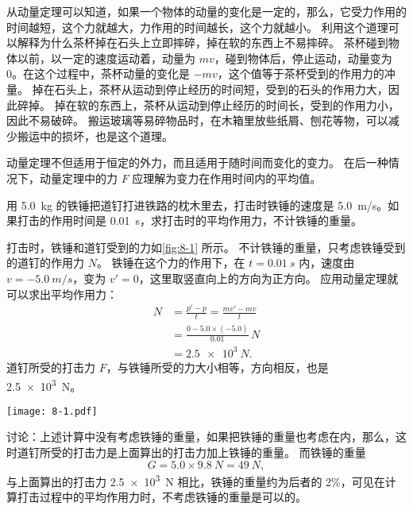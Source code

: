 从动量定理可以知道，如果一个物体的动量的变化是一定的，那么，它受力作用的时间越短，这个力就越大，力作用的时间越长，这个力就越小。
利用这个道理可以解释为什么茶杯掉在石头上立即摔碎，掉在软的东西上不易摔碎。
茶杯碰到物体以前，以一定的速度运动着，动量为 $mv$，碰到物体后，停止运动，动量变为 0。在这个过程中，茶杯动量的变化是 $-mv$，这个值等于茶杯受到的作用力的冲量。
掉在石头上，茶杯从运动到停止经历的时间短，受到的石头的作用力大，因此碎掉。
掉在软的东西上，茶杯从运动到停止经历的时间长，受到的作用力小，因此不易破碎。
搬运玻璃等易碎物品时，在木箱里放些纸屑、刨花等物，可以减少搬运中的损坏，也是这个道理。

动量定理不但适用于恒定的外力，而且适用于随时间而变化的变力。
在后一种情况下，动量定理中的力 $F$ 应理解为变力在作用时间内的平均值。

\begin{example}
用 \qty{5.0}{kg} 的铁锤把道钉打进铁路的枕木里去，打击时铁锤的速度是 \qty{5.0}{m/s}。如果打击的作用时间是 \qty{0.01}{s}，求打击时的平均作用力，不计铁锤的重量。
\end{example}

\medskip\noindent
\begin{minipage}{0.76\linewidth}
\begin{solution}
打击时，铁锤和道钉受到的力如\cref{fig:8-1} 所示。
不计铁锤的重量，只考虑铁锤受到的道钉的作用力 $N$。
铁锤在这个力的作用下，在 $t=\qty{0.01}{s}$ 内，速度由 $v=\qty{-5.0}{m/s}$，变为 $v'=0$，这里取竖直向上的方向为正方向。
应用动量定理就可以求出平均作用力：
\[\begin{split}
    N&=\frac{p'-p}{t}=\frac{mv'-mv}{t}\\
    &=\frac{0-5.0\times (-5.0)}{0.01}\,\unit{N}\\
    &=\qty{2.5e3}{N}.
\end{split}\]
道钉所受的打击力 $F$，与铁锤所受的力大小相等，方向相反，也是 \qty{2.5e3}{N}。
\end{solution}
\end{minipage}\hfill
\begin{minipage}{0.2\linewidth}
  \begin{figurehere}
    \texttt{[image: 8-1.pdf]}
    \caption{}\label{fig:8-1}
  \end{figurehere}
\end{minipage}

\medskip
讨论：上述计算中没有考虑铁锤的重量，如果把铁锤的重量也考虑在内，那么，这时道钉所受的打击力是上面算出的打击力加上铁锤的重量。
而铁锤的重量
\[G=5.0\times \qty{9.8}{N}=\qty{49}{N}, \]
与上面算出的打击力 \qty{2.5e3}{N} 相比，铁锤的重量约为后者的 2\%，可见在计算打击过程中的平均作用力时，不考虑铁锤的重量是可以的。


